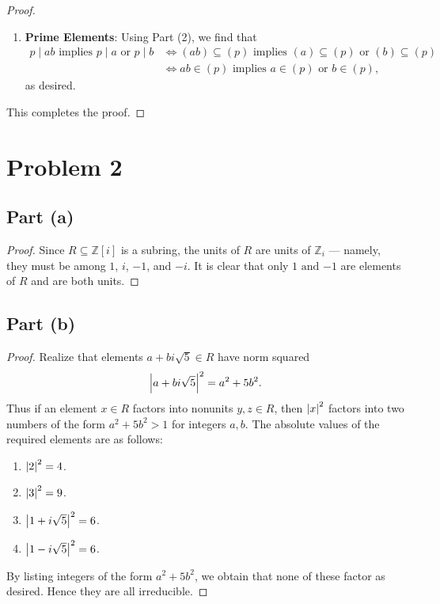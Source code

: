 \documentclass[11pt]{article}
\begin{document}
\begin{proof}
\begin{enumerate}
    \item \textbf{Prime Elements}: Using Part (2), we find that
    \begin{align*}
      p \mid ab \text{ implies } p \mid a \text{ or } p \mid b & \iff (ab) \subseteq (p) \text{ implies } (a) \subseteq (p) \text{ or } (b) \subseteq (p) \\
                                                       & \iff ab \in (p) \text{ implies } a \in (p) \text{ or } b \in (p),
    \end{align*}
    as desired.
  \end{enumerate}
  This completes the proof.
\end{proof}


\section{Problem 2}


\subsection*{Part (a)}

\begin{proof}
  Since $R \subseteq \mathbb{Z}[i]$ is a subring, the units of $R$ are units of $\mathbb{Z}_{i}$ --- namely, they must be among $1$, $i$, $-1$, and $-i$. It is clear that only $\boxed{\text{$1$ and $-1$}}$ are elements of $R$ and are both units.
\end{proof}


\subsection*{Part (b)}
\begin{proof}
  Realize that elements $a + bi \sqrt{5} \in R$ have norm squared
  \[
    \abs{a + bi \sqrt{5}}^{2} = a^{2} + 5 b^{2}.
  \]
  Thus if an element $x \in R$ factors into nonunits $y, z \in R$, then $\abs{x}^{2}$ factors into two numbers of the form $a^{2} + 5b^{2} > 1$ for integers $a, b$. The absolute values of the required elements are as follows:
  \begin{enumerate}
    \item $\abs{2}^{2} = 4$.
    \item $\abs{3}^{2} = 9$. 
    \item $\abs{1 + i\sqrt{5}}^{2} = 6$.
    \item $\abs{1 - i\sqrt{5}}^{2} = 6$.
  \end{enumerate}
  By listing integers of the form $a^{2} + 5b^{2}$, we obtain that none of these factor as desired. Hence they are all irreducible.
\end{proof}
\end{document}
